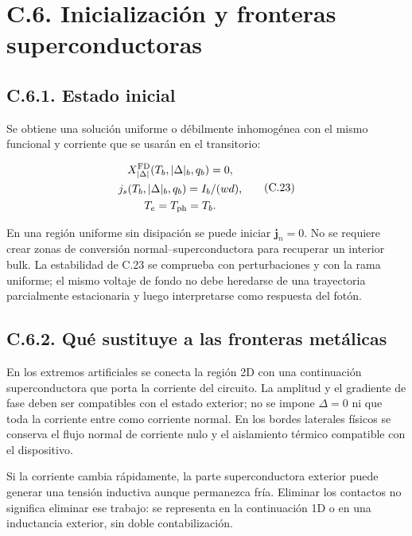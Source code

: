 \documentclass[
  spanish,
  10pt,
  a4paper,
]{article}
\begin{document}
\section{C.6. Inicialización y fronteras
superconductoras}\label{c.6.-inicializaciuxf3n-y-fronteras-superconductoras}

\subsection{C.6.1. Estado inicial}\label{c.6.1.-estado-inicial}

Se obtiene una solución uniforme o débilmente inhomogénea con el mismo
funcional y corriente que se usarán en el transitorio:

\[
\begin{gathered}
X_{|\Delta|}^{\rm FD}(T_b,|\Delta|_b,q_b)=0,\\
j_s(T_b,|\Delta|_b,q_b)=I_b/(wd),\\
T_e=T_{\rm ph}=T_b.
\end{gathered} \tag{C.23}
\]

En una región uniforme sin disipación se puede iniciar
\(\mathbf j_n=0\). No se requiere crear zonas de conversión
normal--superconductora para recuperar un interior bulk. La estabilidad
de C.23 se comprueba con perturbaciones y con la rama uniforme; el mismo
voltaje de fondo no debe heredarse de una trayectoria parcialmente
estacionaria y luego interpretarse como respuesta del fotón.

\subsection{C.6.2. Qué sustituye a las fronteras
metálicas}\label{c.6.2.-quuxe9-sustituye-a-las-fronteras-metuxe1licas}

En los extremos artificiales se conecta la región 2D con una
continuación superconductora que porta la corriente del circuito. La
amplitud y el gradiente de fase deben ser compatibles con el estado
exterior; no se impone \(\Delta=0\) ni que toda la corriente entre como
corriente normal. En los bordes laterales físicos se conserva el flujo
normal de corriente nulo y el aislamiento térmico compatible con el
dispositivo.

Si la corriente cambia rápidamente, la parte superconductora exterior
puede generar una tensión inductiva aunque permanezca fría. Eliminar los
contactos no significa eliminar ese trabajo: se representa en la
continuación 1D o en una inductancia exterior, sin doble
contabilización.
\end{document}
